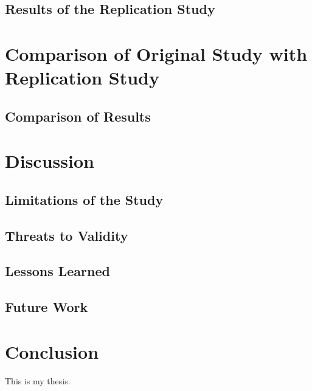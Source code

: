 \documentclass{uvamscse}
\begin{document}
\section{Results of the Replication Study}











\chapter{Comparison of Original Study with Replication Study}

\section{Comparison of Results}




\chapter{Discussion}

\section{Limitations of the Study}

\section{Threats to Validity}

\section{Lessons Learned}

\section{Future Work}





\chapter{Conclusion}

This is my thesis.



{%


}
\end{document}
